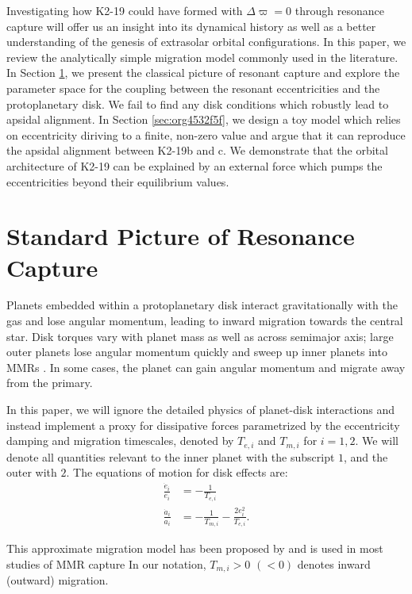\documentclass[usenatbib]{mnras}
\begin{document}
Investigating how K2-19 could have formed with \(\Delta\varpi=0\)
through resonance capture will offer us an insight into its dynamical
history as well as a better understanding of the genesis of extrasolar
orbital configurations.  In this paper, we review the analytically
simple migration model commonly used in the literature.  In Section
\ref{sec:org627aea3}, we present the classical picture of resonant capture
and explore the parameter space for the coupling between the resonant
eccentricities and the protoplanetary disk. We fail to find any disk
conditions which robustly lead to apsidal alignment.  In Section
\ref{sec:org4532f5f}, we design a toy model which relies on eccentricity
diriving to a finite, non-zero value and argue that it can reproduce
the apsidal alignment between K2-19b and c. We demonstrate that the
orbital architecture of K2-19 can be explained by an external force
which pumps the eccentricities beyond their equilibrium values.

\section{Standard Picture of Resonance Capture}
\label{sec:org627aea3}
Planets embedded within a protoplanetary disk interact gravitationally
with the gas and lose angular momentum, leading to inward migration
towards the central star.  Disk torques vary with planet mass as well
as across semimajor axis; large outer planets lose angular momentum
quickly and sweep up inner planets into MMRs
\cite{tanaka_three-dimensional_2004,xu_migration_2018}.  In some
cases, the planet can gain angular momentum and migrate away from the
primary.

In this paper, we will ignore the detailed physics of planet-disk
interactions and instead implement a proxy for dissipative forces
parametrized by the eccentricity damping and migration timescales,
denoted by \(T_{e,i}\) and \(T_{m,i}\) for \(i=1,2\).  We will denote all
quantities relevant to the inner planet with the subscript \(1\), and the
outer with \(2\).  The equations of motion for disk effects are:
\begin{align}\label{eq:disforce}
  \frac{\dot{e}_i}{e_i} &= -\frac{1}{T_{e,i}} \\
  \frac{\dot{a}_i}{a_i} &= -\frac{1}{T_{m,i}} -\frac{2e_i^2}{T_{e,i}}.
\end{align}

\noindent This approximate migration model has been proposed
by \citet{goldreich_disk-satellite_1980-1} and is used in most studies
of MMR capture
\cite[e.g.][]{goldreich_overstable_2014,xu_migration_2018} In our
notation, \(T_{m,i}>0\) \((<0)\) denotes inward (outward) migration.
\end{document}
